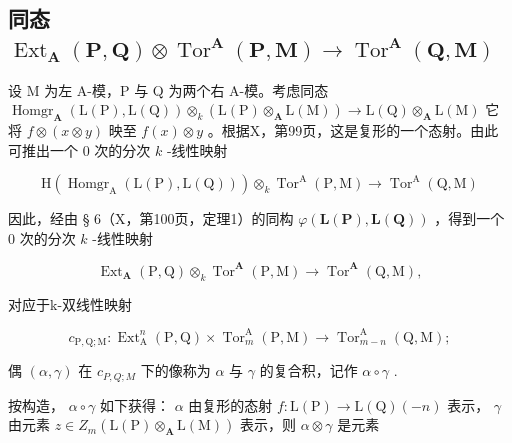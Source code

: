 \subsection{\texorpdfstring{同态 \(\operatorname{Ext}_{\mathbf{A}}(\mathbf{P}, \mathbf{Q}) \otimes \operatorname{Tor}^{\mathbf{A}}(\mathbf{P}, \mathbf{M}) \to \operatorname{Tor}^{\mathbf{A}}(\mathbf{Q}, \mathbf{M})\)}{同态 \textbackslash operatorname\{Ext\}\_\{\textbackslash mathbf\{A\}\}(\textbackslash mathbf\{P\}, \textbackslash mathbf\{Q\}) \textbackslash otimes \textbackslash operatorname\{Tor\}\^{}\{\textbackslash mathbf\{A\}\}(\textbackslash mathbf\{P\}, \textbackslash mathbf\{M\}) \textbackslash 到 \textbackslash operatorname\{Tor\}\^{}\{\textbackslash mathbf\{A\}\}(\textbackslash mathbf\{Q\}, \textbackslash mathbf\{M\})}}

设 M 为左 A-模，P 与 Q 为两个右 A-模。考虑同态 \(\operatorname{Homgr}_{\mathbf{A}}(\mathrm{L}(\mathrm{P}), \mathrm{L}(\mathrm{Q})) \otimes_{k} (\mathrm{L}(\mathrm{P}) \otimes_{\mathbf{A}} \mathrm{L}(\mathrm{M})) \to \mathrm{L}(\mathrm{Q}) \otimes_{\mathbf{A}} \mathrm{L}(\mathrm{M})\) 它将 \(f \otimes (x \otimes y)\) 映至 \(f(x) \otimes y\) 。根据X，第99页，这是复形的一个态射。由此可推出一个 0 次的分次 \(k\) -线性映射

\[
\mathrm{H} (\operatorname{Homgr} _ {\mathrm{A}} (\mathrm{L} (\mathrm{P}), \mathrm{L} (\mathrm{Q}))) \otimes_ {k} \operatorname{Tor} ^ {\mathrm{A}} (\mathrm{P}, \mathrm{M}) \rightarrow \operatorname{Tor} ^ {\mathrm{A}} (\mathrm{Q}, \mathrm{M})
\]

因此，经由 § 6（X，第100页，定理1）的同构 \(\varphi(\mathbf{L}(\mathbf{P}),\mathbf{L}(\mathbf{Q}))\) ，得到一个 0 次的分次 \(k\) -线性映射

\[
\operatorname{Ext} _ {\mathbf {A}} (\mathrm{P}, \mathrm{Q}) \otimes_ {k} \operatorname{Tor} ^ {\mathbf {A}} (\mathrm{P}, \mathrm{M}) \rightarrow \operatorname{Tor} ^ {\mathbf {A}} (\mathrm{Q}, \mathrm{M}),\tag{10}
\]

对应于k-双线性映射

\[
c _ {\mathrm{P}, \mathrm{Q}; \mathrm{M}}: \operatorname{Ext} _ {\mathrm{A}} ^ {n} (\mathrm{P}, \mathrm{Q}) \times \operatorname{Tor} _ {m} ^ {\mathrm{A}} (\mathrm{P}, \mathrm{M}) \rightarrow \operatorname{Tor} _ {m - n} ^ {\mathrm{A}} (\mathrm{Q}, \mathrm{M});\tag{11}
\]

偶 \((\alpha, \gamma)\) 在 \(c_{P,Q;M}\) 下的像称为 \(\alpha\) 与 \(\gamma\) 的复合积，记作 \(\alpha \circ \gamma\) .

按构造， \(\alpha \circ \gamma\) 如下获得： \(\alpha\) 由复形的态射 \(f: \mathrm{L}(\mathrm{P}) \to \mathrm{L}(\mathrm{Q})(-n)\) 表示， \(\gamma\) 由元素 \(z \in Z_m(\mathrm{L}(\mathrm{P}) \otimes_{\mathbf{A}} \mathrm{L}(\mathrm{M}))\) 表示，则 \(\alpha \otimes \gamma\) 是元素

